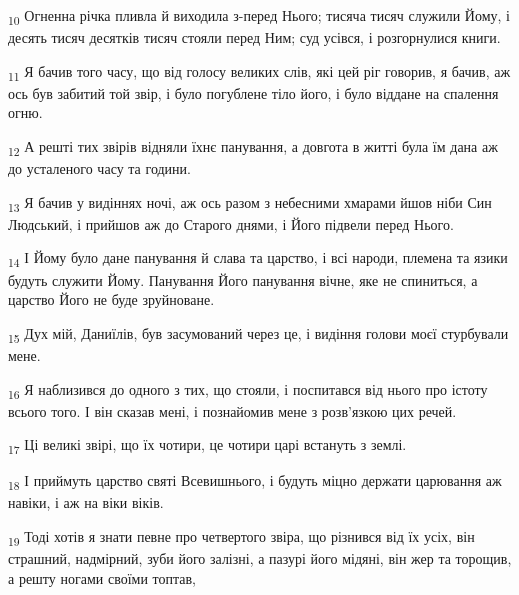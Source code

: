 \begin{tcolorbox}
\textsubscript{10} Огненна річка пливла й виходила з-перед Нього; тисяча тисяч служили Йому, і десять тисяч десятків тисяч стояли перед Ним; суд усівся, і розгорнулися книги.
\end{tcolorbox}
\begin{tcolorbox}
\textsubscript{11} Я бачив того часу, що від голосу великих слів, які цей ріг говорив, я бачив, аж ось був забитий той звір, і було погублене тіло його, і було віддане на спалення огню.
\end{tcolorbox}
\begin{tcolorbox}
\textsubscript{12} А решті тих звірів відняли їхнє панування, а довгота в житті була їм дана аж до усталеного часу та години.
\end{tcolorbox}
\begin{tcolorbox}
\textsubscript{13} Я бачив у видіннях ночі, аж ось разом з небесними хмарами йшов ніби Син Людський, і прийшов аж до Старого днями, і Його підвели перед Нього.
\end{tcolorbox}
\begin{tcolorbox}
\textsubscript{14} І Йому було дане панування й слава та царство, і всі народи, племена та язики будуть служити Йому. Панування Його панування вічне, яке не спиниться, а царство Його не буде зруйноване.
\end{tcolorbox}
\begin{tcolorbox}
\textsubscript{15} Дух мій, Даниїлів, був засумований через це, і видіння голови моєї стурбували мене.
\end{tcolorbox}
\begin{tcolorbox}
\textsubscript{16} Я наблизився до одного з тих, що стояли, і поспитався від нього про істоту всього того. І він сказав мені, і познайомив мене з розв'язкою цих речей.
\end{tcolorbox}
\begin{tcolorbox}
\textsubscript{17} Ці великі звірі, що їх чотири, це чотири царі встануть з землі.
\end{tcolorbox}
\begin{tcolorbox}
\textsubscript{18} І приймуть царство святі Всевишнього, і будуть міцно держати царювання аж навіки, і аж на віки віків.
\end{tcolorbox}
\begin{tcolorbox}
\textsubscript{19} Тоді хотів я знати певне про четвертого звіра, що різнився від їх усіх, він страшний, надмірний, зуби його залізні, а пазурі його мідяні, він жер та торощив, а решту ногами своїми топтав,
\end{tcolorbox}
